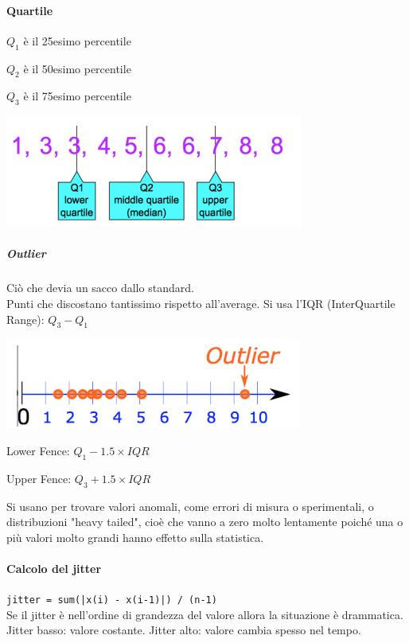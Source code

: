 \documentclass[10pt]{book}
\begin{document}
\paragraph{Quartile} \begin{list}{}{Definiti così:}
		\item $Q_1$ è il 25esimo percentile
		\item $Q_2$ è il 50esimo percentile
		\item $Q_3$ è il 75esimo percentile
\end{list}
\begin{center}
	\includegraphics[scale=1]{quartile.png}
\end{center}
\subparagraph{Outlier} Ciò che devia un sacco dallo standard.\\
Punti che discostano tantissimo rispetto all'average. Si usa l'IQR (InterQuartile Range): $Q_3 - Q_1$
\begin{center}
	\includegraphics[scale=1]{outlier.png}
\end{center}
\begin{list}{}{In statistica, un valore è un outlier quando cado fuori da}
	\item Lower Fence: $Q_1 - 1.5\times IQR$
	\item Upper Fence: $Q_3 + 1.5\times IQR$
\end{list}
Si usano per trovare valori anomali, come errori di misura o sperimentali, o distribuzioni "heavy tailed", cioè che vanno a zero molto lentamente poiché una o più valori molto grandi hanno effetto sulla statistica.
\paragraph{Calcolo del jitter} \texttt{jitter = sum(|x(i) - x(i-1)|) / (n-1)}\\
Se il jitter è nell'ordine di grandezza del valore allora la situazione è drammatica. Jitter basso: valore costante. Jitter alto: valore cambia spesso nel tempo.
\end{document}
